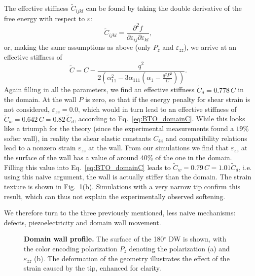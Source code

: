 The effective stiffness $\tilde{C}_{ijkl}$ can be found by taking the double derivative of the free energy with respect to $\varepsilon$:
\begin{equation}
	\tilde{C}_{ijkl} = \frac{\partial^2 f}{\partial \varepsilon_{ij} \partial \varepsilon_{kl}},
\end{equation}
or, making the same assumptions as above (only $P_z$ and $\varepsilon_{zz}$), we arrive at an effective stiffness of
\begin{equation}
	\label{eq:BTO_domainC}
	\tilde{C} = C - \frac{q^2}{2\left(\alpha_{11}^2 - 3 \alpha_{111}\left(\alpha_1  - \frac{q^2 P^2}{C}\right)\right)}.
\end{equation}
Again filling in all the parameters, we find an effective stiffness $\tilde{C}_d = 0.778 \,C$ in the domain.
At the wall $P$ is zero, so that if the energy penalty for shear strain is not considered, $\varepsilon_{zz} = 0.0$, which would in turn lead to an effective stiffness of $\tilde{C}_w = 0.642 \, C = 0.82\, \tilde{C}_d$, according to Eq.~\ref{eq:BTO_domainC}.
While this looks like a triumph for the theory (since the experimental measurements found a $19\%$ softer wall), in reality the shear elastic constants $C_{44}$ and compatibility relations lead to a nonzero strain $\varepsilon_{zz}$ at the wall.
From our simulations we find that $\varepsilon_{zz}$ at the surface of the wall has a value of around 40\% of the one in the domain.
Filling this value into Eq.~\ref{eq:BTO_domainC} leads to $\tilde{C}_w = 0.79 \, C = 1.01 \tilde{C}_d$, i.e. using this naive argument, the wall is actually stiffer than the domain.
The strain texture is shown in Fig.~\ref{fig:BTO_wall}(b).
Simulations with a very narrow tip confirm this result, which can thus not explain the experimentally observed softening.

We therefore turn to the three previously mentioned, less naive mechanisms: defects, piezoelectricity and domain wall movement.

\begin{figure}[h]
	\caption{\label{fig:BTO_wall} {\bf Domain wall profile.} The surface of the 180$^\circ$ DW is shown, with the color encoding polarization $P_z$ denoting the polarization (a) and $\varepsilon_{zz}$ (b). The deformation of the geometry illustrates the effect of the strain caused by the tip, enhanced for clarity.}
\end{figure}

